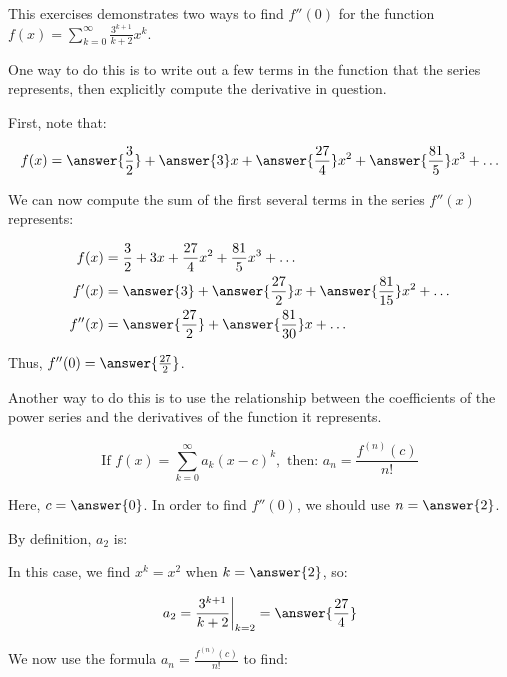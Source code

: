 \documentclass{ximera}
\author{Jim Talamo}
\begin{document}
\begin{exercise}
This exercises demonstrates two ways to find $f''(0)$ for the function $f(x) = \sum_{k=0}^{\infty} \frac{3^{k+1}}{k+2}x^k$.  

One way to do this is to write out a few terms in the function that the series represents, then explicitly compute the derivative in question.  

First, note that:

\[
f(x) = \answer{\frac{3}{2}}+\answer{3}x+\answer{\frac{27}{4}}x^2+\answer{\frac{81}{5}}x^3+\ldots
\]

\begin{exercise}
We can now compute the sum of the first several terms in the series $f''(x)$ represents:

\begin{align*}
f(x) &= \frac{3}{2}+3x+\frac{27}{4}x^2+\frac{81}{5}x^3+\ldots \\
f'(x) &= \answer{3}+\answer{\frac{27}{2}}x+\answer{\frac{81}{15}}x^2+\ldots \\
f''(x) &= \answer{\frac{27}{2}}+\answer{\frac{81}{30}}x+\ldots \\
\end{align*}

Thus, $f''(0) = \answer{\frac{27}{2}}$.
\end{exercise}

\begin{exercise}
Another way to do this is to use the relationship between the coefficients of the power series and the derivatives of the function it represents.

\[
\textrm{If } f(x) = \sum_{k=0}^{\infty} a_k(x-c)^k, \textrm{ then: } a_n = \frac{f^{(n)}(c)}{n!}
\]

Here, $c=\answer{0}$.  In order to find $f''(0)$, we should use $n=\answer{2}$.

By definition, $a_2$ is:

\begin{multipleChoice}
\end{multipleChoice}

In this case, we find $x^k = x^2$ when $k=\answer{2}$, so:

\[
a_2 =  \frac{3^{k+1}}{k+2} \bigg|_{k=2} = \answer{\frac{27}{4}}
\]

\begin{exercise}
We now use the formula $a_n = \frac{f^{(n)}(c)}{n!}$ to find:


\end{exercise}
\end{exercise}
\end{exercise}
\end{document}
